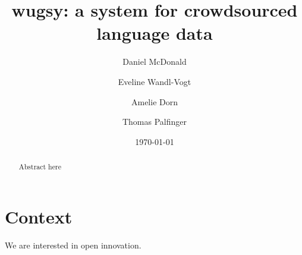 \documentclass{article}
\title{wugsy: a system for crowdsourced language data}
\date{\today}
\author{Daniel McDonald \and Eveline Wandl-Vogt \and Amelie Dorn \and Thomas Palfinger}
\begin{document}
\maketitle

\begin{abstract}
Abstract here
\end{abstract}

\section{Context}

We are interested in open innovation.
\end{document}
